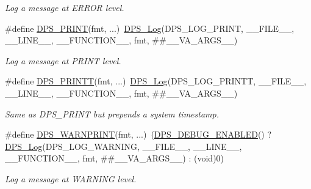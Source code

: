 \begin{DoxyCompactItemize}
$$\begin{DoxyCompactList}\small\item\em Log a message at E\+R\+R\+OR level. \end{DoxyCompactList}\item 
\mbox{\label{group__debug_gaf1d25cc7f1d2d92f96ba620217af28fd}} 
\#define \hyperlink{group__debug_gaf1d25cc7f1d2d92f96ba620217af28fd}{D\+P\+S\+\_\+\+P\+R\+I\+NT}(fmt, ...)~\hyperlink{group__debug_ga174fef61dca16376546e570c9b831502}{D\+P\+S\+\_\+\+Log}(D\+P\+S\+\_\+\+L\+O\+G\+\_\+\+P\+R\+I\+NT, \+\_\+\+\_\+\+F\+I\+L\+E\+\_\+\+\_\+, \+\_\+\+\_\+\+L\+I\+N\+E\+\_\+\+\_\+, \+\_\+\+\_\+\+F\+U\+N\+C\+T\+I\+O\+N\+\_\+\+\_\+, fmt, \#\#\+\_\+\+\_\+\+V\+A\+\_\+\+A\+R\+G\+S\+\_\+\+\_\+)
\begin{DoxyCompactList}\small\item\em Log a message at P\+R\+I\+NT level. \end{DoxyCompactList}\item 
\mbox{\label{group__debug_gad9a3f4ae1ed318b313434a82132c4044}} 
\#define \hyperlink{group__debug_gad9a3f4ae1ed318b313434a82132c4044}{D\+P\+S\+\_\+\+P\+R\+I\+N\+TT}(fmt, ...)~\hyperlink{group__debug_ga174fef61dca16376546e570c9b831502}{D\+P\+S\+\_\+\+Log}(D\+P\+S\+\_\+\+L\+O\+G\+\_\+\+P\+R\+I\+N\+TT, \+\_\+\+\_\+\+F\+I\+L\+E\+\_\+\+\_\+, \+\_\+\+\_\+\+L\+I\+N\+E\+\_\+\+\_\+, \+\_\+\+\_\+\+F\+U\+N\+C\+T\+I\+O\+N\+\_\+\+\_\+, fmt, \#\#\+\_\+\+\_\+\+V\+A\+\_\+\+A\+R\+G\+S\+\_\+\+\_\+)
\begin{DoxyCompactList}\small\item\em Same as D\+P\+S\+\_\+\+P\+R\+I\+NT but prepends a system timestamp. \end{DoxyCompactList}\item 
\mbox{\label{group__debug_ga37ab9dbe492fd9f7b78349f6e789e5f2}} 
\#define \hyperlink{group__debug_ga37ab9dbe492fd9f7b78349f6e789e5f2}{D\+P\+S\+\_\+\+W\+A\+R\+N\+P\+R\+I\+NT}(fmt, ...)~(\hyperlink{group__debug_gaeca5ec86966717c8dd2d1ffda4be2b3b}{D\+P\+S\+\_\+\+D\+E\+B\+U\+G\+\_\+\+E\+N\+A\+B\+L\+ED}() ? \hyperlink{group__debug_ga174fef61dca16376546e570c9b831502}{D\+P\+S\+\_\+\+Log}(D\+P\+S\+\_\+\+L\+O\+G\+\_\+\+W\+A\+R\+N\+I\+NG, \+\_\+\+\_\+\+F\+I\+L\+E\+\_\+\+\_\+, \+\_\+\+\_\+\+L\+I\+N\+E\+\_\+\+\_\+, \+\_\+\+\_\+\+F\+U\+N\+C\+T\+I\+O\+N\+\_\+\+\_\+, fmt, \#\#\+\_\+\+\_\+\+V\+A\+\_\+\+A\+R\+G\+S\+\_\+\+\_\+) \+: (void)0)
\begin{DoxyCompactList}\small\item\em Log a message at W\+A\+R\+N\+I\+NG level. \end{DoxyCompactList}\end{DoxyCompactItemize}
